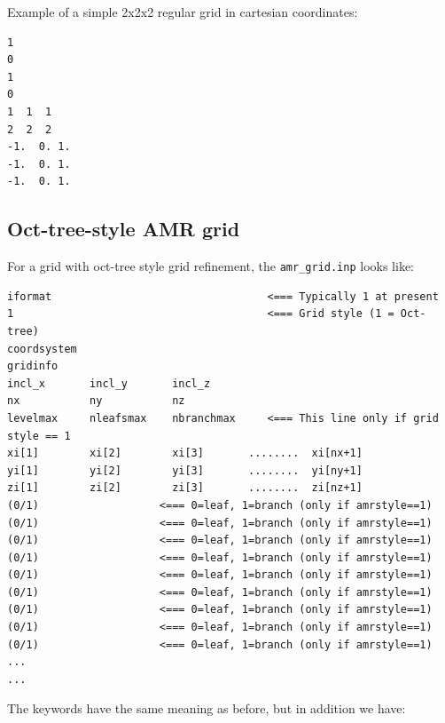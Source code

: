 \documentclass{report}
\newenvironment{asciibox}%
  {\begin{list}{}{%
    \setlength{\topsep}{0.5em}%
    \setlength{\parskip}{0em}%
    \setlength{\parsep}{0em}%
    \setlength{\itemsep}{0em}%
    \setlength{\rightmargin}{0em}%
    \setlength{\leftmargin}{3.0em}%
    \setlength{\labelsep}{1em}%
    \setlength{\labelwidth}{2em}%
  }\normalfont\footnotesize\item}
  {\end{list}}
\begin{document}
Example of a simple 2x2x2 regular grid in cartesian coordinates:
\begin{asciibox}\begin{verbatim}
1
0
1
0
1  1  1
2  2  2
-1.  0. 1.
-1.  0. 1.
-1.  0. 1.
\end{verbatim}\end{asciibox}


\subsection{Oct-tree-style AMR grid}
\label{sec-amr-grid-oct-tree}
%
For a grid with oct-tree style grid refinement, the {\small\tt amr\_grid.inp}
looks like:
\begin{asciibox}\begin{verbatim}
iformat                                  <=== Typically 1 at present
1                                        <=== Grid style (1 = Oct-tree)
coordsystem
gridinfo
incl_x       incl_y       incl_z
nx           ny           nz
levelmax     nleafsmax    nbranchmax     <=== This line only if grid style == 1
xi[1]        xi[2]        xi[3]       ........  xi[nx+1]
yi[1]        yi[2]        yi[3]       ........  yi[ny+1]
zi[1]        zi[2]        zi[3]       ........  zi[nz+1]
(0/1)                   <=== 0=leaf, 1=branch (only if amrstyle==1)
(0/1)                   <=== 0=leaf, 1=branch (only if amrstyle==1)
(0/1)                   <=== 0=leaf, 1=branch (only if amrstyle==1)
(0/1)                   <=== 0=leaf, 1=branch (only if amrstyle==1)
(0/1)                   <=== 0=leaf, 1=branch (only if amrstyle==1)
(0/1)                   <=== 0=leaf, 1=branch (only if amrstyle==1)
(0/1)                   <=== 0=leaf, 1=branch (only if amrstyle==1)
(0/1)                   <=== 0=leaf, 1=branch (only if amrstyle==1)
(0/1)                   <=== 0=leaf, 1=branch (only if amrstyle==1)
...
...
\end{verbatim}\end{asciibox}
The keywords have the same meaning as before, but in addition we have:
\end{document}
